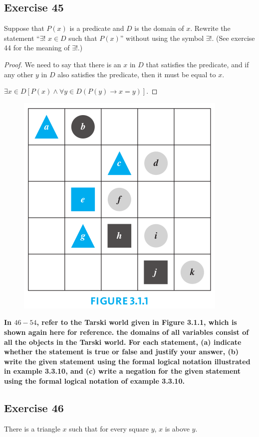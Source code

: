 \documentclass[14pt]{extarticle}
\newcommand{\fa}{\forall}
\newcommand{\te}{\exists}
\begin{document}
\subsection{Exercise 45}
Suppose that $P(x)$ is a predicate and $D$ is the domain of $x$. Rewrite the statement “$\te$! $x \in D$ such that $P(x)$” without using the symbol $\te$!. (See exercise 44 for the meaning of $\te$!.)

\begin{proof}
We need to say that there is an $x$ in $D$ that satisfies the predicate, and if any other $y$ in $D$ also satisfies the predicate, then it must be equal to $x$.

$\te x \in D [P(x) \wedge \fa y \in D (P(y) \to x = y)]$.
\end{proof}

\begin{figure}[ht!]
\centering
\includegraphics[scale=0.4]{../images/3.1.1.png}
\end{figure}

{\bf \color{cyan} In $46-54$, refer to the Tarski world given in Figure 3.1.1, which is shown again here for reference. the domains of all variables consist of all the objects in the Tarski world. For each statement, (a) indicate whether the statement is true or false and justify your answer, (b) write the given statement using the formal logical notation illustrated in example 3.3.10, and (c) write a negation for the given statement using the formal logical notation of example 3.3.10.}

\subsection{Exercise 46}
There is a triangle $x$ such that for every square $y$, $x$ is above $y$.
\end{document}
